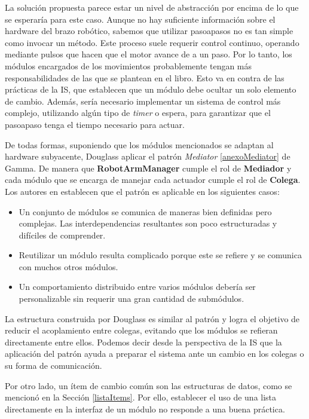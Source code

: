 La solución propuesta parece estar un nivel de abstracción por encima de lo que se esperaría para este caso. Aunque no hay suficiente información sobre el hardware del brazo robótico, sabemos que utilizar \glspl{pasoapaso} no es tan simple como invocar un método. Este proceso suele requerir control continuo, operando mediante pulsos que hacen que el motor avance de a un paso. Por lo tanto, los módulos encargados de los movimientos probablemente tengan más responsabilidades de las que se plantean en el libro. Esto va en contra de las prácticas de la \gls{IS}, que establecen que un módulo debe ocultar un solo elemento de cambio. Además, sería necesario implementar un sistema de control más complejo, utilizando algún tipo de \textit{timer} o espera, para garantizar que el \gls{pasoapaso} tenga el tiempo necesario para actuar.

De todas formas, suponiendo que los módulos mencionados se adaptan al hardware subyacente, Douglass aplicar el patrón \textit{Mediator} \ref{anexoMediator} de Gamma. De manera que \textbf{RobotArmManager} cumple el rol de \textbf{Mediador} y cada módulo que se encarga de manejar cada actuador cumple el rol de \textbf{Colega}. Los autores en \cite{Gamma:1995:DPE:186897} establecen que el patrón es aplicable en los siguientes casos:
\begin{itemize}
\item Un conjunto de módulos se comunica de maneras bien definidas pero complejas. Las interdependencias resultantes son poco estructuradas y difíciles de comprender.

\item Reutilizar un módulo resulta complicado porque este se refiere y se comunica con muchos otros módulos.

\item Un comportamiento distribuido entre varios módulos debería ser personalizable sin requerir una gran cantidad de submódulos.
\end{itemize}

La estructura construida por Douglass es similar al patrón y logra el objetivo de reducir el acoplamiento entre colegas, evitando que los módulos se refieran directamente entre ellos. Podemos decir desde la perspectiva de la \gls{IS} que la aplicación del patrón ayuda a preparar el sistema ante un cambio en los colegas o su forma de comunicación.

Por otro lado, un ítem de cambio común son las estructuras de datos, como se mencionó en la Sección \ref{listaItems}. Por ello, establecer el uso de una lista directamente en la interfaz de un módulo no responde a una buena práctica.

